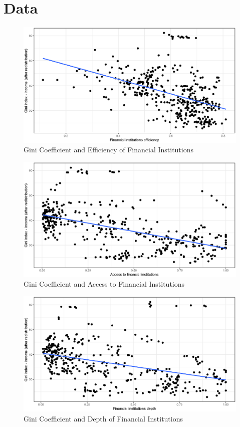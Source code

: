 \documentclass[a4paper,11pt]{article}
\begin{document}
\section{Data}
\begin{figure}
    \caption{Gini Coefficient and Efficiency of Financial Institutions}
    \label{fig:ginifie}
\includegraphics[width=\textwidth, keepaspectratio]{figures/FIEGiniNet}
\end{figure}

\begin{figure}
    \caption{Gini Coefficient and Access to Financial Institutions}
    \label{fig:ginifia}
\includegraphics[width=\textwidth, keepaspectratio]{figures/FIAGiniNet}
\end{figure}

\begin{figure}
    \caption{Gini Coefficient and Depth of Financial Institutions}
    \label{fig:ginifid}
\includegraphics[width=\textwidth, keepaspectratio]{figures/FIDGiniNet}
\end{figure}
\end{document}
